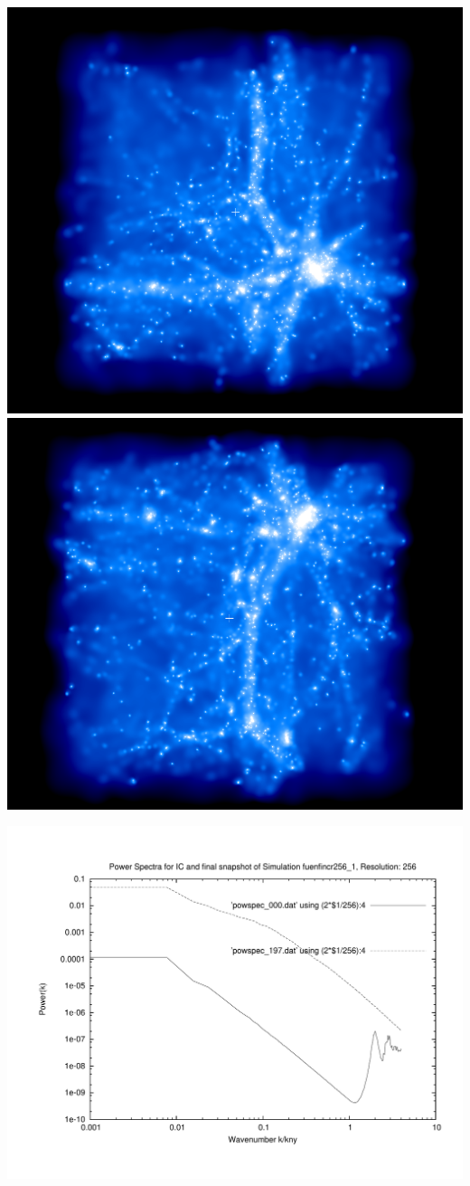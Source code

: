 \includegraphics[scale=0.2]{r256/h100/fuenfincr256_1/1.png} 
\includegraphics[scale=0.2]{r256/h100/fuenfincr256_1/2.png}

\includegraphics[scale=0.5]{r256/h100/fuenfincr256_1/plot_powspec_fuenfincr256_1}


